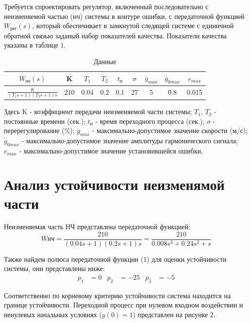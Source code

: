 \documentclass[russian, utf8]{eskdtext}
\renewcommand{\arraystretch}{1.3}
\begin{document}
Требуется спроектировать регулятор, включенный последовательно с неизменяемой частью (нч) системы в контуре ошибки, с передаточной функцией $W_\text{рег}(s)$, который обеспечивает в замкнутой следящей системе с единичной обратной связью заданый набор показателей качества. Показатели качества указаны в таблице 1. \par
\begin{table}[h!]
    \centering
    \begin{threeparttable}        
        \caption{Данные}
        \def\arraystretch{2}
        \begin{tabular} {|c|c|c|c|c|c|c|c|c|}
            \hline
            $W_\text{нч}(s)$ & K & $T_1$ & $T_2$ & $t_\text{п}$ & $\sigma$ & $\dot{g}_{max}$ & $\dot{g}_{0max}$ & $e_{max}$ \\ \hline 
            $\displaystyle\frac{K}{(T_1s + 1)(T_2s + 1)s}$ & 210 & 0.04 & 0.2 & 0.1 & 27 & 5 & 0.8 & 0.015 \\ [2mm] \hline 
        \end{tabular}
    \end{threeparttable}
\end{table}
Здесь
K - коэффициент передачи неизменяемой части системы;
$T_1$, $T_2$ - постоянные времени (сек.);
$t_\text{п}$ - время переходного процесса (сек.);
$\sigma$ - перерегулирование (\%);
$\dot{g}_{max}$ - максимально-допустимое значение скорости (м/с);
$\dot{g}_{0max}$ - максимально-допустимое значение амплитуды гармонического сигнала;
$e_{max}$ - максимально-допустимое значение установившейся ошибки, \par

\newpage
\section{Анализ устойчивости неизменямой части}

Неизменяемая часть НЧ представлена передаточной функцией:
\begin{equation}
    W\text{нч} = \frac{210}{(0.04s + 1)(0.2s + 1)s} = \frac{210}{0.008s^3 + 0.24s^2 + s}
\end{equation}

Также найдем полюса передаточной функции (1) для оценки устойчивости системы, они представлены ниже:
\begin{align*}
    p_1 & = 0 & p_2 & = -25 & p_3 & = -5
\end{align*}

Соответственно по корневому критерию устойчивости система находится на границе устойчивости. Переходной процесс при нулевом входном воздействии и ненулевых начальных условиях ($y(0) = 1$) представлен на рисунке 2.
\end{document}
